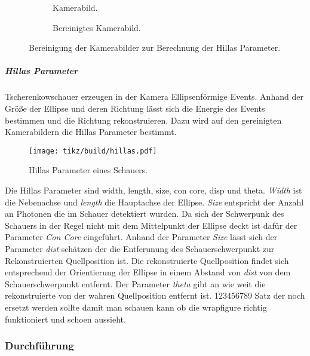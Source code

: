 \begin{figure}[htpb]
	\centering
	\begin{subfigure}[c]{0.35\linewidth}
		\caption{Kamerabild.}%
		\label{fig:uncleaned}
	\end{subfigure}
	\begin{subfigure}[c]{0.35\linewidth}
		\caption{Bereinigtes Kamerabild.}%
		\label{fig:cleaned}
	\end{subfigure}
	\caption{Bereinigung der Kamerabilder zur Berechnung der Hillas Parameter.}%
	\label{fig:cleaning}
\end{figure}

\subparagraph{Hillas Parameter}%
\label{spar:hillas_parameter}

Tscherenkowschauer erzeugen in der Kamera Ellipsenförmige Events.
Anhand der Größe der Ellipse und deren Richtung lässt sich die Energie des
Events bestimmen und die Richtung rekonstruieren.
Dazu wird auf den gereinigten Kamerabildern die Hillas Parameter bestimmt.


\begin{wrapfigure}[15]{o}{0.4\textwidth}
	\centering
	\texttt{[image: tikz/build/hillas.pdf]}
	\caption{Hillas Parameter eines Schauers.}%
	\label{fig:hillas}
\end{wrapfigure}


Die Hillas Parameter sind width, length, size, con core, disp und theta.
\textit{Width} ist die Nebenachse und \textit{length} die Hauptachse der Ellipse. 
\textit{Size} entspricht der Anzahl an Photonen die im Schauer detektiert wurden.
Da sich der Schwerpunk des Schauers in der Regel nicht mit dem Mittelpunkt der
Ellipse deckt ist dafür der Parameter \textit{Con Core} eingeführt.
Anhand der Parameter \textit{Size} lässt sich der Parameter \textit{dist}
schätzen der die Entferunung des Schauerschwerpunkt zur Rekonstruierten
Quellposition ist.
Die rekonstruierte Quellposition findet sich entsprechend der Orientierung der
Ellipse in einem Abstand von \textit{dist} von dem Schauerschwerpunkt entfernt.
Der Parameter \textit{theta} gibt an wie weit die rekonstruierte von der wahren
Quellposition entfernt ist.
123456789 Satz der noch ersetzt werden sollte damit man schauen kann ob die wrapfigure
richtig funktioniert und schoen aussieht.

\subsubsection*{Durchführung}
